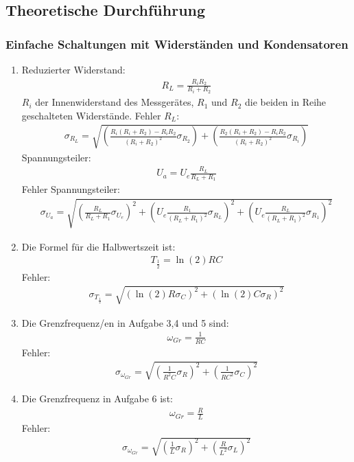 \documentclass[12pt]{scrartcl}
\begin{document}
\subsection{Theoretische Durchführung}
\subsubsection{Einfache Schaltungen mit Widerständen und Kondensatoren}
\begin{enumerate}
\item
Reduzierter Widerstand:
\begin{align}
R_L = \frac{R_i R_2}{R_i + R_2}
\end{align}
$R_i$ der Innenwiderstand des Messgerätes,
$R_1$ und $R_2$ die beiden in Reihe geschalteten Widerstände.
Fehler $R_L$:
\begin{align}
\sigma_{R_L} = \sqrt{
\left(\frac{R_i(R_i+R_2)-R_i R_2}{(R_i + R_2)^2}\sigma_{R_2}\right)+
\left(\frac{R_2(R_i+R_2)-R_i R_2}{(R_i + R_2)^2}\sigma_{R_i}\right)}
\end{align}
Spannungsteiler:
\begin{align}
U_a = U_e \frac{R_L}{R_L + R_1}
\end{align}
Fehler Spannungsteiler:
\begin{align}
\sigma_{U_a} = \sqrt{
\left(\frac{R_L}{R_L + R_1}\sigma_{U_e}\right)^2+
\left(U_e \frac{R_1}{(R_L + R_1)^2}\sigma_{R_L}\right)^2+
\left(U_e \frac{R_L}{(R_L + R_1)^2}\sigma_{R_1}\right)^2}
\end{align}
\item
Die Formel für die Halbwertszeit ist:
\begin{align}
T_{\frac{1}{2}} = \ln(2)RC
\end{align}
Fehler:
\begin{align}
\sigma_{T_{\frac{1}{2}}} = \sqrt{
\left(\ln(2)R\sigma_{C}\right)^2+
\left(\ln(2)C\sigma_{R}\right)^2}
\end{align}
\item
Die Grenzfrequenz/en in Aufgabe 3,4 und 5 sind:
\begin{align}
\omega_{Gr} = \frac{1}{RC}
\end{align}
Fehler:
\begin{align}
\sigma_{\omega_{Gr}} = \sqrt{
\left(\frac{1}{R^2C}\sigma_R\right)^2+
\left(\frac{1}{RC^2}\sigma_C\right)^2}
\end{align}
\item
Die Grenzfrequenz in Aufgabe 6 ist:
\begin{align}
\omega_{Gr} = \frac{R}{L}
\end{align}
Fehler:
\begin{align}
\sigma_{\omega_{Gr}} = \sqrt{\left(\frac{1}{L}\sigma_R\right)^2+\left(\frac{R}{L^2}\sigma_L\right)^2}
\end{align}

\end{enumerate}
\end{document}
